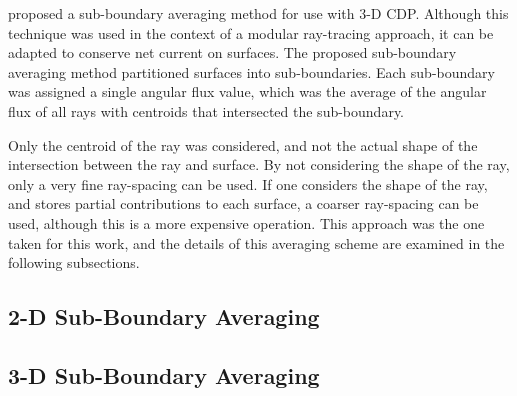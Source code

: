 {{      \citet{Liu2014} proposed a sub-boundary averaging method for use with 3-D \ac{CDP}.
      Although this technique was used in the context of a modular ray-tracing approach, it can be adapted to conserve net current on surfaces.
      The proposed sub-boundary averaging method partitioned surfaces into sub-boundaries.
      Each sub-boundary was assigned a single angular flux value, which was the average of the angular flux of all rays with centroids that intersected the sub-boundary.

      Only the centroid of the ray was considered, and not the actual shape of the intersection between the ray and surface.
      By not considering the shape of the ray, only a very fine ray-spacing can be used.
      If one considers the shape of the ray, and stores partial contributions to each surface, a coarser ray-spacing can be used, although this is a more expensive operation.
      This approach was the one taken for this work, and the details of this averaging scheme are examined in the following subsections.

      \subsection{2-D Sub-Boundary Averaging}{\label{ssec:RT:2-D Sub-Boundary Averaging}
        \blindtext[4]
      }
      \subsection{3-D Sub-Boundary Averaging}{\label{ssec:3-D Sub-Boundary Averaging}
        \blindtext[8]
      }
    }
}
